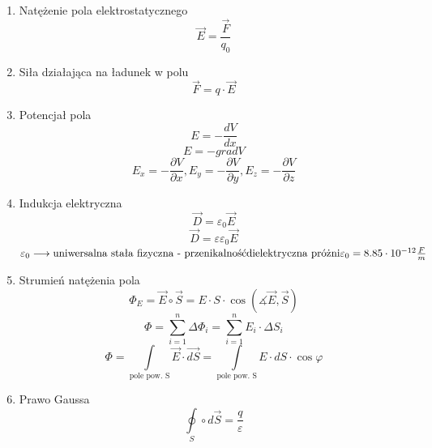 \documentclass{article}
\begin{document}
\begin{enumerate}
		\begin{enumerate}
			\item Natężenie pola elektrostatycznego
			\[
			\vec{E} = \frac{\vec{F}}{q_0}
			\]
			\item Siła działająca na ładunek w polu
			\[
			\vec{F} = q \cdot \vec{E}
			\]
			\item Potencjał pola
			\[
			E = - \frac{dV}{dx}
			\]
			\[
			E = - grad V
			\]
			\[
			E_x = - \frac{\partial V}{\partial x}, E_y = - \frac{\partial V}{\partial y}, E_z = - \frac{\partial V}{\partial z}
			\]
			\item Indukcja elektryczna
			\[
			\vec{D} = \varepsilon_0 \vec{E}
			\]
			\[
			\vec{D} = \varepsilon \varepsilon_0 \vec{E}
			\]
			$
			\varepsilon_0 \longrightarrow \text{uniwersalna stała fizyczna - przenikalność} \\
			\text{dielektryczna próżni} \\
			\varepsilon_0 = 8.85 \cdot 10^{-12} \frac{F}{m} \\
			$
			\newpage
			\item Strumień natężenia pola
			\[
			\varPhi_E = \vec{E} \circ \vec{S} = E \cdot S \cdot \cos (\measuredangle \vec{E}, \vec{S})
			\]
			\[
			\Phi = \sum\limits_{i = 1}^{n} \Delta \Phi_i = \sum\limits_{i = 1}^{n} E_i \cdot \Delta S_i
			\]
			\[
			\Phi = \int\limits_{\text{pole pow. S}} \vec{E} \cdot \overrightarrow{dS} = \int\limits_{\text{pole pow. S}} E \cdot dS \cdot \cos \varphi
			\]
			\item Prawo Gaussa
			\[
			\oint\limits_S \circ d \vec{S} = \frac{q}{\varepsilon}
			\]
		\end{enumerate}
	
	\end{enumerate}
	
\end{document}
